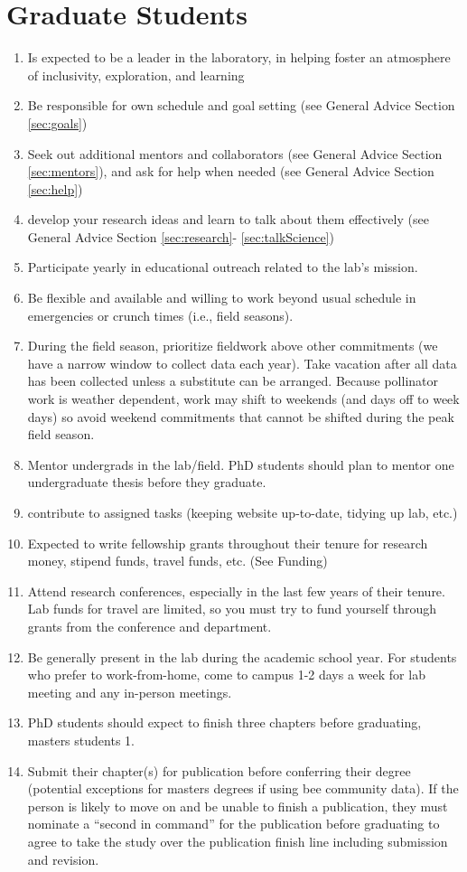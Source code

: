 \documentclass[12pt]{article}
\begin{document}
\section{Graduate Students}
\begin{enumerate}
\item Is expected to be a leader in the laboratory, in helping foster
  an atmosphere of inclusivity, exploration, and  learning
\item Be responsible for own schedule and goal setting (see General Advice
  Section \ref{sec:goals})
\item Seek out additional mentors and collaborators (see General
  Advice Section \ref{sec:mentors}), and ask for help when needed (see
  General Advice Section \ref{sec:help})
\item develop your research ideas and learn to talk about them
  effectively (see General Advice Section \ref{sec:research}-
  \ref{sec:talkScience})
 \item Participate yearly in educational outreach related to the lab's mission.
\item Be flexible and available and willing to work beyond usual
  schedule in emergencies or crunch times (i.e., field seasons).
 \item During the field season, prioritize fieldwork above other
   commitments (we have a narrow window to collect data each
   year). Take vacation after all data has been collected unless a
   substitute can be arranged. Because pollinator work is weather
   dependent, work may shift to weekends (and days off to week days)
   so avoid weekend commitments that cannot be shifted during the peak
   field season.
\item Mentor undergrads in the lab/field. PhD students should plan to
  mentor one undergraduate thesis before they graduate.
\item contribute to assigned tasks (keeping website up-to-date,
  tidying up lab, etc.)
\item Expected to write fellowship grants throughout their tenure for
  research money, stipend funds, travel funds, etc. (See Funding)
\item Attend research conferences, especially in the last few years of
  their tenure. Lab funds for travel are limited, so you must try to
  fund yourself through grants from the conference and department.
\item Be generally present in the lab during the academic school
  year. For students who prefer to work-from-home, come to campus 1-2
  days a week for lab meeting and any in-person meetings. 
\item PhD students should expect to finish three chapters before
  graduating, masters students 1. 
\item Submit their chapter(s) for publication before conferring their
  degree (potential exceptions for masters degrees if using bee
  community data). If the person is likely to move on and be unable to
  finish a publication, they must nominate a ``second in command'' for
  the publication before graduating to agree to take the study over
  the publication finish line including submission and revision.
\end{enumerate}
\end{document}

